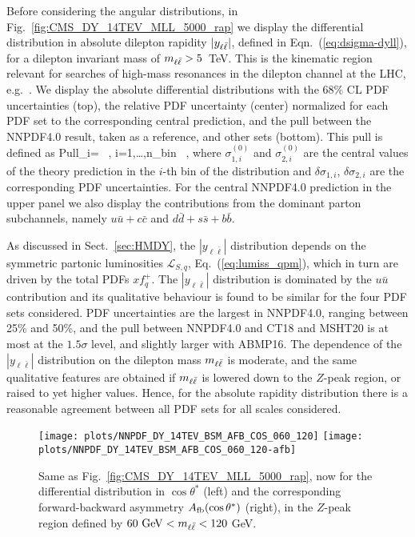 Before considering the angular distributions, in
Fig.~\ref{fig:CMS_DY_14TEV_MLL_5000_rap} we display the 
differential distribution in absolute dilepton rapidity $|y_{\ell\bar{\ell}}|$,
defined in Eqn.~(\ref{eq:dsigma-dyll}),
for a dilepton invariant mass of $m_{\ell\bar{\ell}} > 5$~TeV.
%
This is the kinematic region relevant for searches of high-mass resonances
in the dilepton channel at the LHC, e.g.~\cite{ATLAS:2019erb,Khachatryan:2016zqb}.
%
We display the absolute differential distributions with the 68\% CL PDF uncertainties
(top), the relative PDF uncertainty (center) normalized for each PDF
set to the corresponding central prediction, and the pull between the
NNPDF4.0 result, taken as a reference, and other sets (bottom).
%
This pull is    defined as
    \be
\label{eq:pulldef_xsec}
{\rm Pull}_i=  \, , \qquad i=1,\ldots,n_{\rm bin} \, ,
\ee
where  $\sigma^{(0)}_{1,i}$ and $\sigma^{(0)}_{2,i}$ are the central values of the
theory prediction in the $i$-th bin of the distribution and $\delta \sigma_{1,i}$, $\delta \sigma_{2,i}$ are
the corresponding PDF uncertainties.
%
For the central NNPDF4.0 prediction in the upper panel we also display the
contributions from the dominant parton subchannels, namely
$u\bar{u}+c\bar{c}$ and $d\bar{d}+s\bar{s}+b\bar{b}$.

As discussed in Sect.~\ref{sec:HMDY}, the  $|y_{\ell\bar{\ell}}|$  distribution
depends  on the symmetric partonic luminosities $\mathcal{L}_{S,q}$, Eq.~(\ref{eq:lumiss_qpm}),
which in turn are driven by the total PDFs $xf^+_q$.
%
The $|y_{\ell\bar{\ell}}|$  distribution
is dominated by the $u\bar{u}$
contribution and its qualitative behaviour is found to be similar for the four PDF sets considered.
%
PDF uncertainties are the largest in NNPDF4.0, ranging between 25\% and 50\%,
and the pull between NNPDF4.0 and  CT18 and MSHT20 is at most at the
$1.5\sigma$ level, and slightly larger  
with ABMP16.
%
The dependence of the $|y_{\ell\bar{\ell}}|$  distribution on the dilepton mass $m_{\ell\bar{\ell}}$
is moderate, and the same qualitative features are
obtained if $m_{\ell\bar{\ell}}$ is lowered down to the $Z$-peak region, or
raised to yet higher values.
%
Hence, for the absolute rapidity distribution there is a
reasonable agreement between all  PDF sets for all scales considered.

\begin{figure}[t]
\centering
\texttt{[image: plots/NNPDF\_DY\_14TEV\_BSM\_AFB\_COS\_060\_120]}
\texttt{[image: plots/NNPDF\_DY\_14TEV\_BSM\_AFB\_COS\_060\_120-afb]}
\caption{Same as Fig.~\ref{fig:CMS_DY_14TEV_MLL_5000_rap}, now for the differential distribution in
  $\cos\theta^*$ (left)
  and the corresponding forward-backward asymmetry
  $A_{\rm fb}(\cos\theta^*)$ (right), in the $Z$-peak region defined by $60~{\rm GeV} < m_{\ell\bar{\ell}} < 120$ GeV.}
\label{fig:CMS_DY_14TEV_MLL_zpeak}
\end{figure}

